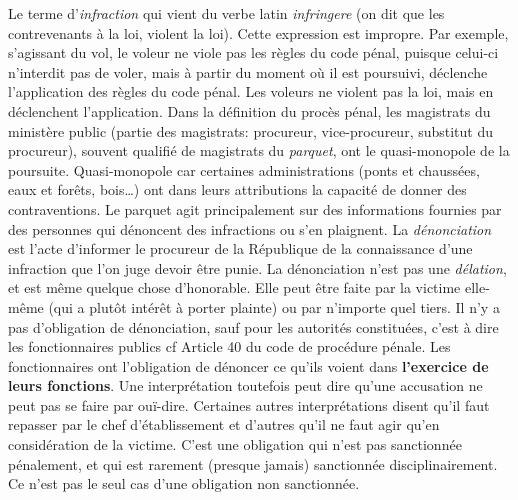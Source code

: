 \documentclass[math]{cours}
\begin{document}
	Le terme d'\emph{infraction} qui vient du verbe latin \emph{infringere} (on dit que les contrevenants à la loi, violent la loi).
	Cette expression est impropre.
	Par exemple, s'agissant du vol, le voleur ne viole pas les règles du code pénal, puisque celui-ci n'interdit pas de voler, mais à partir du moment où il est poursuivi, déclenche l'application des règles du code pénal.
	Les voleurs ne violent pas la loi, mais en déclenchent l'application.
	Dans la définition du procès pénal, les magistrats du ministère public (partie des magistrats: procureur, vice-procureur, substitut du procureur), souvent qualifié de magistrats du \emph{parquet}, ont le quasi-monopole de la poursuite.
	Quasi-monopole car certaines administrations (ponts et chaussées, eaux et forêts, bois\ldots) ont dans leurs attributions la capacité de donner des contraventions.
	Le parquet agit principalement sur des informations fournies par des personnes qui dénoncent des infractions ou s'en plaignent.
	La \emph{dénonciation} est l'acte d'informer le procureur de la République de la connaissance d'une infraction que l'on juge devoir être punie.
	La dénonciation n'est pas une \emph{délation}, et est même quelque chose d'honorable.
	Elle peut être faite par la victime elle-même (qui a plutôt intérêt à porter plainte) ou par n'importe quel tiers.
	Il n'y a pas d'obligation de dénonciation, sauf pour les autorités constituées, c'est à dire les fonctionnaires publics cf Article 40 du code de procédure pénale.
	Les fonctionnaires ont l'obligation de dénoncer ce qu'ils voient dans \textbf{l'exercice de leurs fonctions}.
	Une interprétation toutefois peut dire qu'une accusation ne peut pas se faire par ouï-dire.
	Certaines autres interprétations disent qu'il faut repasser par le chef d'établissement et d'autres qu'il ne faut agir qu'en considération de la victime.
	C'est une obligation qui n'est pas sanctionnée pénalement, et qui est rarement (presque jamais) sanctionnée disciplinairement.
	Ce n'est pas le seul cas d'une obligation non sanctionnée.\\
\end{document}
